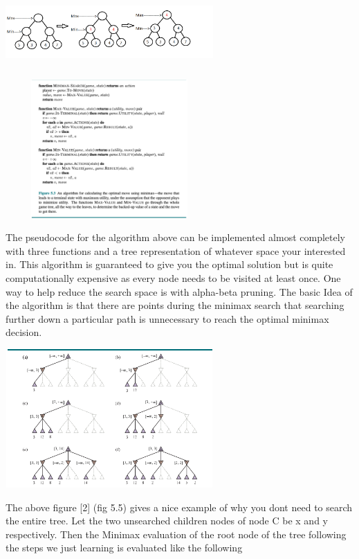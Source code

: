\includegraphics[width=300px,height=100px]{images/minimax_example.png}

\includegraphics[width=300px,height=200px]{images/minimax_algo.png}

The pseudocode for the algorithm above can be implemented almost completely with three functions and a tree representation of whatever space your interested in. This algorithm is guaranteed to give you the optimal solution but is quite computationally expensive as every node needs to be visited at least once. One way to help reduce the search space is with alpha-beta pruning. The basic Idea of the algorithm is that there are points during the minimax search that searching further down a particular path is unnecessary to reach the optimal minimax decision. 

\includegraphics[width=300px,height=200px]{images/alpha_beta_figure.png}

The above figure [2] (fig 5.5) gives a nice example of why you dont need to search the entire tree. Let the two unsearched children nodes of node C be x and y respectively. Then the Minimax evaluation of the root node of the tree following the steps we just learning is evaluated like the following 

